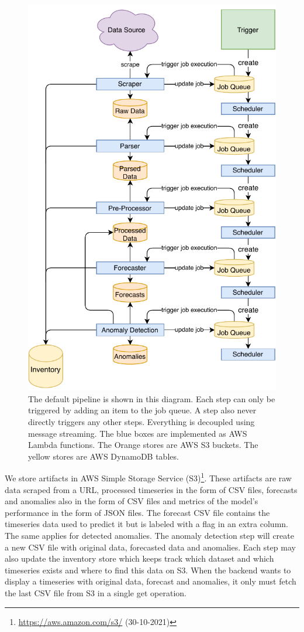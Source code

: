 \begin{figure}
\centerline{\includegraphics[scale=.7]{Figures/pipeline-diagram.pdf}}
\caption{The default pipeline is shown in this diagram. Each step can only be triggered by adding an item to the job queue. A step also never directly triggers any other steps. Everything is decoupled using message streaming. The blue boxes are implemented as AWS Lambda functions. The Orange stores are AWS S3 buckets. The yellow stores are AWS DynamoDB tables.}
\label{fig:pipeline-diagram}
\end{figure}

We store artifacts in AWS Simple Storage Service (S3)\footnote{\url{https://aws.amazon.com/s3/} (30-10-2021)}. These artifacts are raw data scraped from a URL, processed timeseries in the form of CSV files, forecasts and anomalies also in the form of CSV files and metrics of the model's performance in the form of JSON files. The forecast CSV file contains the timeseries data used to predict it but is labeled with a flag in an extra column. The same applies for detected anomalies. The anomaly detection step will create a new CSV file with original data, forecasted data and anomalies. Each step may also update the inventory store which keeps track which dataset and which timeseries exists and where to find this data on S3. When the backend wants to display a timeseries with original data, forecast and anomalies, it only must fetch the last CSV file from S3 in a single get operation.

